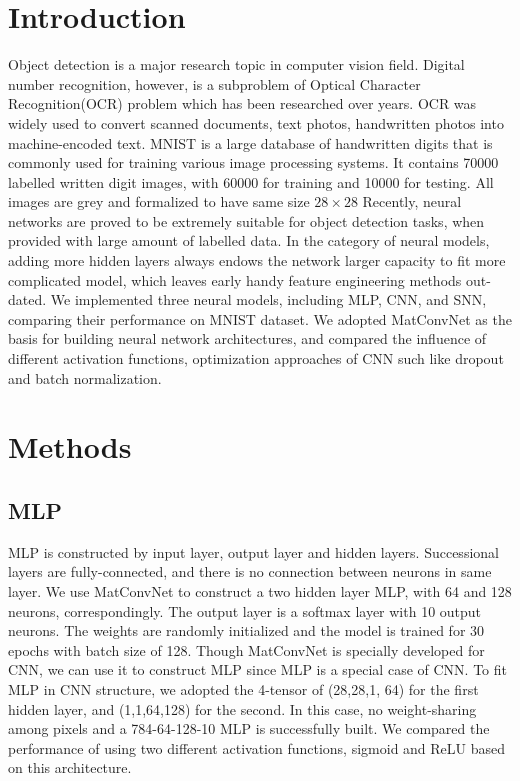 \documentclass[10pt,twocolumn,letterpaper]{article}
\begin{document}
\section{Introduction}
Object detection is a major research topic in computer vision field. Digital number recognition, however, is a subproblem of Optical Character Recognition(OCR) problem which has been researched over years. OCR was widely used to convert scanned documents, text photos, handwritten photos into machine-encoded text. MNIST is a large database of handwritten digits that is commonly used for training various image processing systems. It contains 70000 labelled written digit images, with 60000 for training and 10000 for testing. All images are grey and formalized to have same size $28\times 28$ Recently, neural networks are proved to be extremely suitable for object detection tasks, when provided with large amount of labelled data. In the category of neural models, adding more hidden layers always endows the network larger capacity to fit more complicated model, which leaves early handy feature engineering methods out-dated. We implemented three neural models, including MLP, CNN, and SNN, comparing their performance on MNIST dataset. We adopted MatConvNet as the basis for building neural network architectures, and compared the influence of different activation functions,  optimization approaches of CNN such like dropout and batch normalization. 


\section{Methods}
\subsection{MLP}
MLP is constructed by input layer, output layer and hidden layers. Successional layers are fully-connected, and there is no connection between neurons in same layer. We use MatConvNet to construct a two hidden layer MLP, with 64 and 128 neurons, correspondingly. The output layer is a
softmax layer with 10 output neurons. The weights are randomly initialized and the model is trained for 30 epochs with batch size of 128. Though MatConvNet is specially developed for CNN, we can use it to construct MLP since MLP is a special case of CNN. To fit MLP in CNN structure, we adopted the 4-tensor of (28,28,1, 64) for the first hidden layer, and (1,1,64,128) for the second. In this case, no weight-sharing among pixels and a 784-64-128-10 MLP is successfully built. We compared the performance of using two different activation functions, sigmoid and ReLU based on this architecture. 
\end{document}
